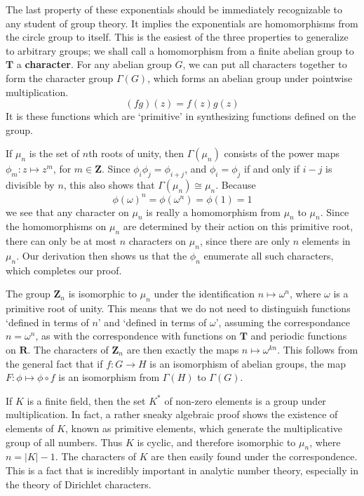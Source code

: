 The last property of these exponentials should be immediately recognizable to any student of group theory. It implies the exponentials are homomorphisms from the circle group to itself. This is the easiest of the three properties to generalize to arbitrary groups; we shall call a homomorphism from a finite abelian group to $\mathbf{T}$ a {\bf character}. For any abelian group $G$, we can put all characters together to form the character group $\Gamma(G)$, which forms an abelian group under pointwise multiplication.
%
\[ (fg)(z) = f(z)g(z) \]
%
It is these functions which are `primitive' in synthesizing functions defined on the group.

\begin{example}
    If $\mu_n$ is the set of $n$th roots of unity, then $\Gamma(\mu_n)$ consists of the power maps $\phi_m: z \mapsto z^m$, for $m \in \mathbf{Z}$. Since $\phi_i \phi_j = \phi_{i+j}$, and $\phi_i = \phi_j$ if and only if $i - j$ is divisible by $n$, this also shows that $\Gamma(\mu_n) \cong \mu_n$. Because
    \[ \phi(\omega)^n = \phi(\omega^n) = \phi(1) = 1 \]
    we see that any character on $\mu_n$ is really a homomorphism from $\mu_n$ to $\mu_n$. Since the homomorphisms on $\mu_n$ are determined by their action on this primitive root, there can only be at most $n$ characters on $\mu_n$, since there are only $n$ elements in $\mu_n$. Our derivation then shows us that the $\phi_n$ enumerate all such characters, which completes our proof.
\end{example}

\begin{example}
    The group $\mathbf{Z}_n$ is isomorphic to $\mu_n$ under the identification $n \mapsto \omega^n$, where $\omega$ is a primitive root of unity. This means that we do not need to distinguish functions `defined in terms of $n$' and `defined in terms of $\omega$', assuming the correspondance $n = \omega^n$, as with the correspondence with functions on $\mathbf{T}$ and periodic functions on $\mathbf{R}$. The characters of $\mathbf{Z}_n$ are then exactly the maps $n \mapsto \omega^{kn}$. This follows from the general fact that if $f: G \to H$ is an isomorphism of abelian groups, the map $F: \phi \mapsto \phi \circ f$ is an isomorphism from $\Gamma(H)$ to $\Gamma(G)$.
\end{example}

\begin{example}
    If $K$ is a finite field, then the set $K^*$ of non-zero elements is a group under multiplication. In fact, a rather sneaky algebraic proof shows the existence of elements of $K$, known as primitive elements, which generate the multiplicative group of all numbers. Thus $K$ is cyclic, and therefore isomorphic to $\mu_n$, where $n = |K| - 1$. The characters of $K$ are then easily found under the correspondence. This is a fact that is incredibly important in analytic number theory, especially in the theory of Dirichlet characters.
\end{example}

